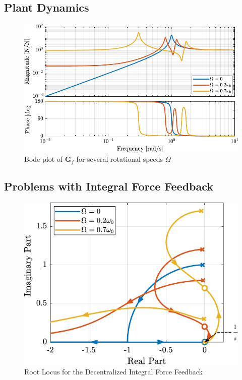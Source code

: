 \documentclass{ISMA_USD2020}
\begin{document}
\subsection{Plant Dynamics}
\label{sec:org0a22a10}

\begin{figure}[htbp]
\centering
\includegraphics[scale=1]{figs/plant_iff_compare_rotating_speed.pdf}
\caption{\label{fig:plant_iff_compare_rotating_speed}Bode plot of \(\bm{G}_f\) for several rotational speeds \(\Omega\)}
\end{figure}

\subsection{Problems with Integral Force Feedback}
\label{sec:orgd432439}

\begin{figure}[htbp]
\centering
\includegraphics[scale=1]{figs/root_locus_pure_iff.pdf}
\caption{\label{fig:root_locus_pure_iff}Root Locus for the Decentralized Integral Force Feedback}
\end{figure}
\end{document}
